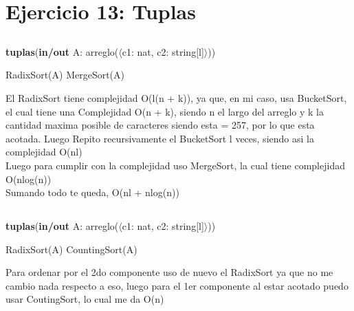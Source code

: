 \section{Ejercicio 13: Tuplas}

\subsection{}
\begin{algorithm}[H]
\caption{
    \textbf{tuplas}(\textbf{in/out} A: arreglo($\langle$c1: nat, c2: string[l]$\rangle$))
}
    \begin{algorithmic}[1]
        \State RadixSort(A) 
        \State MergeSort(A) 
    \end{algorithmic}
\end{algorithm}

El RadixSort tiene complejidad O(l(n + k)), ya que, en mi caso, usa BucketSort, el cual tiene una Complejidad O(n + k), siendo n el largo del arreglo y k la cantidad maxima posible de caracteres siendo esta = 257, por lo que esta acotada. Luego Repito recursivamente el BucketSort l veces, siendo asi la complejidad O(nl)\\
Luego para cumplir con la complejidad uso MergeSort, la cual tiene complejidad O(nlog(n)) \\
Sumando todo te queda, O(nl + nlog(n))

\subsection{}
\begin{algorithm}[H]
\caption{
    \textbf{tuplas}(\textbf{in/out} A: arreglo($\langle$c1: nat, c2: string[l]$\rangle$))
}
    \begin{algorithmic}[1]
        \State RadixSort(A) 
        \State CountingSort(A) 
    \end{algorithmic}
\end{algorithm}

Para ordenar por el 2do componente uso de nuevo el RadixSort ya que no me cambio nada respecto a eso, luego para el 1er componente al estar acotado puedo usar CoutingSort, lo cual me da O(n)